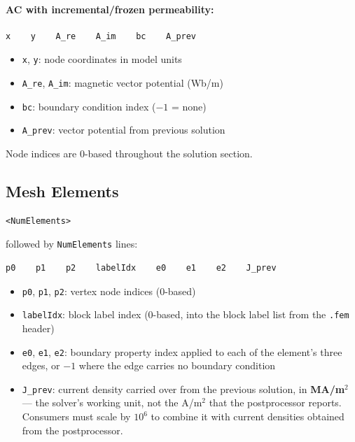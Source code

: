 \documentclass[11pt]{article}
\begin{document}
\paragraph{AC with incremental/frozen permeability:}
\begin{lstlisting}
x    y    A_re    A_im    bc    A_prev
\end{lstlisting}

\begin{itemize}[nosep]
  \item \texttt{x}, \texttt{y}: node coordinates in model units
  \item \texttt{A\_re}, \texttt{A\_im}: magnetic vector potential (Wb/m)
  \item \texttt{bc}: boundary condition index ($-1$ = none)
  \item \texttt{A\_prev}: vector potential from previous solution
\end{itemize}

Node indices are 0-based throughout the solution section.

\subsection{Mesh Elements}

\begin{lstlisting}
<NumElements>
\end{lstlisting}

followed by \texttt{NumElements} lines:

\begin{lstlisting}
p0    p1    p2    labelIdx    e0    e1    e2    J_prev
\end{lstlisting}

\begin{itemize}[nosep]
  \item \texttt{p0}, \texttt{p1}, \texttt{p2}: vertex node indices (0-based)
  \item \texttt{labelIdx}: block label index (0-based, into the block label
        list from the \texttt{.fem} header)
  \item \texttt{e0}, \texttt{e1}, \texttt{e2}: boundary property index applied
        to each of the element's three edges, or $-1$ where the edge carries
        no boundary condition
  \item \texttt{J\_prev}: current density carried over from the previous
        solution, in \textbf{MA/m$^2$} --- the solver's working unit, not the
        A/m$^2$ that the postprocessor reports.  Consumers must scale by
        $10^6$ to combine it with current densities obtained from the
        postprocessor.
\end{itemize}
\end{document}
